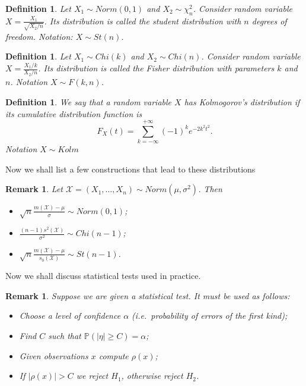 \documentclass[12pt]{article}
\newtheorem{remark}[theorem]{Remark}
\newtheorem{definition}[theorem]{Definition}
\begin{document}
\begin{definition} Let $X_1\sim Norm(0, 1)$ and $X_2\sim \chi_n^2$. Consider
    random variable $X=\frac{X_1}{\sqrt{X_2/n}}$. Its distribution is called the
    student distribution with $n$ degrees of freedom. Notation: $X\sim St(n)$.
\end{definition}

\begin{definition} Let $X_1\sim Chi(k)$ and $X_2\sim Chi(n)$. Consider random
    variable $X=\frac{X_1/k}{X_2/n}$. Its distribution is called the Fisher
    distribution with parameters $k$ and $n$. Notation $X\sim F(k,n)$.
\end{definition}

\begin{definition} We say that a random variable $X$ has Kolmogorov's
    distribution if its cumulative distribution function is
    $$
        F_X(t)=\sum_{k=-\infty}^{+\infty} {(-1)}^k e^{-2k^2t^2}.
    $$
    Notation $X\sim Kolm$
\end{definition}

Now we shall list a few constructions that lead to these distributions

\begin{remark} Let $\mathscr{X}=(X_1,\ldots, X_n)\sim Norm(\mu,\sigma^2)$. Then
    \begin{itemize}
        \item $\sqrt{n}\frac{m(\mathscr{X})-\mu}{\sigma}\sim Norm(0,1)$;
        \item $\frac{(n-1)s^2(\mathscr{X})}{\sigma^2}\sim Chi(n-1)$;
        \item $\sqrt{n}\frac{m(\mathscr{X})-\mu}{s_0(\mathscr{X})}\sim St(n-1)$.
    \end{itemize}
\end{remark}

Now we shall discuss statistical tests used in practice.

\begin{remark}
    Suppose we are given a statistical test. It must be used as follows:
    \begin{itemize}
        \item Choose a level of confidence $\alpha$ (i.e.\ probability of errors
              of the first kind);
        \item Find $C$ such that $\mathbb{P}(|\eta|\geq C)=\alpha$;
        \item Given observations $x$ compute $\rho(x)$;
        \item If $|\rho(x)|>C$ we reject $H_1$, otherwise reject $H_2$.
    \end{itemize}
\end{remark}
\end{document}
